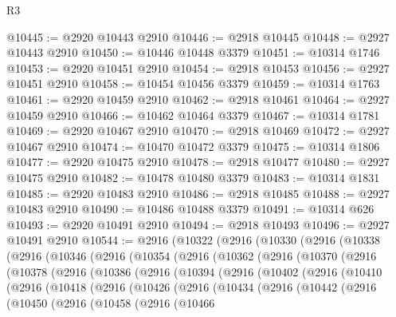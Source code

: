 \begin{lexlean}{R3}
\begin{coremodule}
@10445 := @2920 @10443 @2910
@10446 := @2918 @10445
@10448 := @2927 @10443 @2910
@10450 := @10446 @10448 @3379
@10451 := @10314 @1746
@10453 := @2920 @10451 @2910
@10454 := @2918 @10453
@10456 := @2927 @10451 @2910
@10458 := @10454 @10456 @3379
@10459 := @10314 @1763
@10461 := @2920 @10459 @2910
@10462 := @2918 @10461
@10464 := @2927 @10459 @2910
@10466 := @10462 @10464 @3379
@10467 := @10314 @1781
@10469 := @2920 @10467 @2910
@10470 := @2918 @10469
@10472 := @2927 @10467 @2910
@10474 := @10470 @10472 @3379
@10475 := @10314 @1806
@10477 := @2920 @10475 @2910
@10478 := @2918 @10477
@10480 := @2927 @10475 @2910
@10482 := @10478 @10480 @3379
@10483 := @10314 @1831
@10485 := @2920 @10483 @2910
@10486 := @2918 @10485
@10488 := @2927 @10483 @2910
@10490 := @10486 @10488 @3379
@10491 := @10314 @626
@10493 := @2920 @10491 @2910
@10494 := @2918 @10493
@10496 := @2927 @10491 @2910
@10544 := @2916
    (@10322
      (@2916
        (@10330
          (@2916
            (@10338
              (@2916
                (@10346
                  (@2916
                    (@10354
                      (@2916
                        (@10362
                          (@2916
                            (@10370
                              (@2916
                                (@10378
                                  (@2916
                                    (@10386
                                      (@2916
                                        (@10394
                                          (@2916
                                            (@10402
                                              (@2916
                                                (@10410
                                                  (@2916
                                                    (@10418
                                                      (@2916
                                                        (@10426
                                                          (@2916
                                                            (@10434
                                                              (@2916
                                                                (@10442
                                                                  (@2916
                                                                    (@10450
                                                                      (@2916
                                                                        (@10458
                                                                          (@2916
                                                                            (@10466

\end{coremodule}
\end{lexlean}
